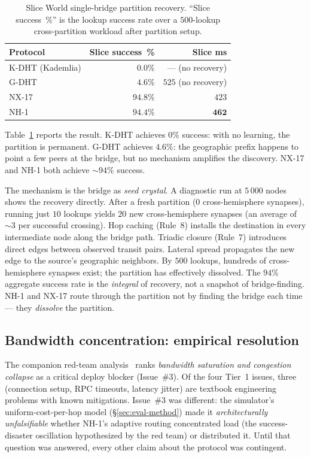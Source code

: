 \documentclass[conference]{IEEEtran}
\newcommand{\nhone}{NH-1\xspace}
\newcommand{\GDHT}{G-DHT\xspace}
\newcommand{\NXseventeen}{NX-17\xspace}
\begin{document}
\begin{table}[t]
\centering
\caption{Slice World single-bridge partition recovery. ``Slice
success~\%'' is the lookup success rate over a $500$-lookup
cross-partition workload after partition setup.}
\label{tab:slice}
\small
\begin{tabular}{@{}lrr@{}}
\toprule
\textbf{Protocol} & \textbf{Slice success~\%} & \textbf{Slice ms} \\
\midrule
K-DHT (Kademlia) & $0.0\%$ & --- (no recovery) \\
\GDHT & $4.6\%$ & $525$ (no recovery) \\
\NXseventeen & $94.8\%$ & $423$ \\
\nhone & $\mathbf{94.4\%}$ & $\mathbf{462}$ \\
\bottomrule
\end{tabular}
\end{table}

Table~\ref{tab:slice} reports the result. K-DHT achieves $0\%$
success: with no learning, the partition is permanent. \GDHT achieves
$4.6\%$: the geographic prefix happens to point a few peers at the
bridge, but no mechanism amplifies the discovery. \NXseventeen and
\nhone both achieve $\sim\!94\%$ success.

The mechanism is the bridge as \emph{seed crystal}. A diagnostic run
at $5\,000$ nodes shows the recovery directly. After a fresh partition
($0$ cross-hemisphere synapses), running just $10$ lookups yields $20$
new cross-hemisphere synapses (an average of $\sim\!3$ per
successful crossing). Hop caching (Rule~8) installs the destination
in every intermediate node along the bridge path. Triadic closure
(Rule~7) introduces direct edges between observed transit pairs.
Lateral spread propagates the new edge to the source's geographic
neighbors. By $500$ lookups, hundreds of cross-hemisphere synapses
exist; the partition has effectively dissolved. The $94\%$ aggregate
success rate is the \emph{integral} of recovery, not a snapshot of
bridge-finding. \nhone and \NXseventeen route through the partition
not by finding the bridge each time --- they \emph{dissolve} the
partition.

\subsection{Bandwidth concentration: empirical resolution}
\label{sec:eval-bandwidth}

The companion red-team analysis~\cite{nh1redteam2026} ranks
\emph{bandwidth saturation and congestion collapse} as a critical
deploy blocker (Issue~\#3). Of the four Tier~1 issues, three
(connection setup, RPC timeouts, latency jitter) are textbook
engineering problems with known mitigations. Issue~\#3 was different:
the simulator's uniform-cost-per-hop model (\S\ref{sec:eval-method})
made it \emph{architecturally unfalsifiable} whether \nhone's
adaptive routing concentrated load (the success-disaster oscillation
hypothesized by the red team) or distributed it. Until that question
was answered, every other claim about the protocol was contingent.
\end{document}
